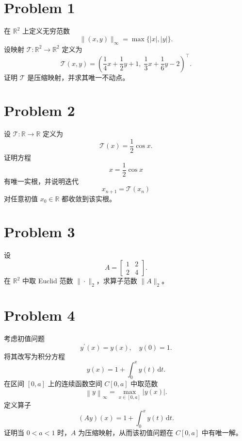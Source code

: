 \section*{Problem 1}

在 $\mathbb{R}^2$ 上定义无穷范数
\[
\|(x,y)\|_\infty = \max\{|x|,|y|\}.
\]
设映射 $\mathcal{T} : \mathbb{R}^2 \to \mathbb{R}^2$ 定义为
\[
\mathcal{T} \left(x,y\right) = \left(\frac14 x + \frac12 y + 1,\; \frac13 x + \frac16 y - 2\right)^\top.
\]
证明 $\mathcal{T}$ 是压缩映射，并求其唯一不动点。

\section*{Problem 2}

设 $\mathcal{T} : \mathbb{R} \to \mathbb{R}$ 定义为
\[
\mathcal{T}(x) = \frac12 \cos x.
\]
证明方程
\[
x = \frac12 \cos x
\]
有唯一实根，并说明迭代
\[
x_{n+1} = \mathcal{T}(x_n)
\]
对任意初值 $x_0 \in \mathbb{R}$ 都收敛到该实根。

\section*{Problem 3}

设
\[
A =
\begin{bmatrix}
1 & 2 \\
2 & 4
\end{bmatrix}.
\]
在 $\mathbb{R}^2$ 中取 Euclid 范数 $\|\cdot\|_2$，求算子范数 $\|A\|_2$。

\section*{Problem 4}

考虑初值问题
\[
y^\prime \left(x\right) = y\left(x\right),\quad y\left(0\right) = 1.
\]
将其改写为积分方程
\[
y\left(x\right) = 1 + \int_0^x y\left(t\right)\, \mathrm{d} t.
\]
在区间 $[0,a]$ 上的连续函数空间 $C\left[0,a\right]$ 中取范数
\[
\left\|y\right\|_\infty = \max_{x \in \left[0,a\right]} \left|y\left(x\right)\right|.
\]
定义算子
\[
\left(Ay\right)\left(x\right) = 1 + \int_0^x y\left(t\right)\, \mathrm{d} t.
\]
证明当 $0 < a < 1$ 时，$A$ 为压缩映射，从而该初值问题在 $C\left[0,a\right]$ 中有唯一解。

